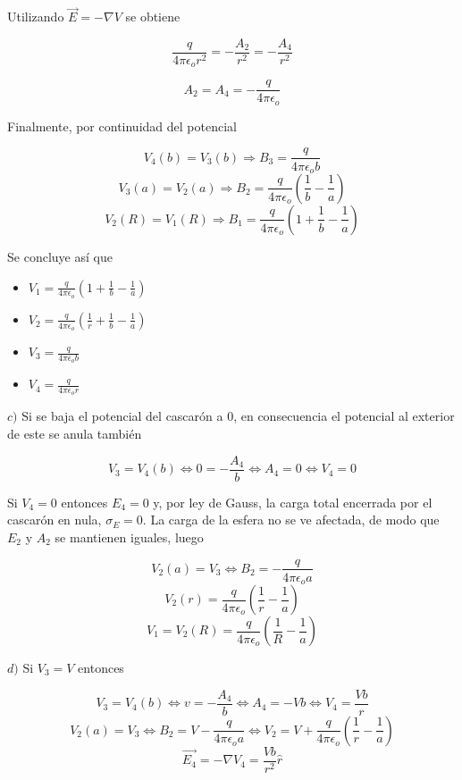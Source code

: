 Utilizando $\Vec{E} = -\nabla V$ se obtiene

\[\frac{q}{4\pi\epsilon_o r^2} = -\frac{A_2}{r^2} = -\frac{A_4}{r^2}\]

\[A_2 = A_4 = -\frac{q}{4\pi\epsilon_o}\]

Finalmente, por continuidad del potencial

\[V_4(b) = V_3(b) \Rightarrow B_3 = \frac{q}{4\pi\epsilon_o b}\]
\[V_3(a) = V_2(a) \Rightarrow B_2 = \frac{q}{4\pi\epsilon_o}
\left(\frac{1}{b}-\frac{1}{a}\right)\]
\[V_2(R) = V_1(R) \Rightarrow B_1 = \frac{q}{4\pi\epsilon_o}
\left(1+\frac{1}{b}-\frac{1}{a}\right)\]

Se concluye así que

\begin{itemize}
    \item $V_1 = \frac{q}{4\pi\epsilon_o}
\left(1+\frac{1}{b}-\frac{1}{a}\right)$
    \item $V_2 = \frac{q}{4\pi\epsilon_o}\left(
    \frac{1}{r}+\frac{1}{b}-\frac{1}{a}\right)$
    \item $V_3 = \frac{q}{4\pi\epsilon_o b}$
    \item $V_4 = \frac{q}{4\pi\epsilon_o r}$
\end{itemize}
\bigbreak

$c)$ Si se baja el potencial del cascarón a 0, en consecuencia el potencial al exterior de este se anula también

\[V_3 = V_4(b) \Leftrightarrow 0 = -\frac{A_4}{b} \Leftrightarrow A_4 = 0	\Leftrightarrow V_4 = 0\]

Si $V_4 = 0$ entonces $E_4= 0$ y, por ley de Gauss, la carga total encerrada por el cascarón en nula, $\sigma_E = 0$. La carga de la esfera no se ve afectada, de modo que $E_2$ y $A_2$ se mantienen iguales, luego

\[V_2(a) = V_3 \Leftrightarrow B_2 = -\frac{q}{4\pi\epsilon_o a}\]
\[V_2(r) = \frac{q}{4\pi\epsilon_o}\left(\frac{1}{r}
-\frac{1}{a}\right)\]
\[V_1 = V_2(R) = \frac{q}{4\pi\epsilon_o}\left(\frac{1}{R}
-\frac{1}{a}\right)\]

\bigbreak

$d)$ Si $V_3 = V$ entonces

\[V_3 = V_4(b) \Leftrightarrow v = -\frac{A_4}{b} \Leftrightarrow A_4 = -Vb	\Leftrightarrow V_4 = \frac{Vb}{r}\]
\[V_2(a) = V_3 \Leftrightarrow B_2 = V-\frac{q}{4\pi\epsilon_o a}
\Leftrightarrow V_2 = V+\frac{q}{4\pi\epsilon_o}\left(\frac{1}{r}
-\frac{1}{a}\right)\]
\[\Vec{E_4}=-\nabla V_4 = \frac{Vb}{r^2}\hat{r}\]

